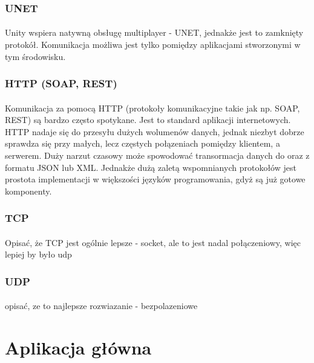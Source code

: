 \documentclass[12pt]{article}
\begin{document}
{{\subsubsection{UNET}
\paragraph{}
Unity wspiera natywną obsługę multiplayer - UNET, jednakże jest to zamknięty protokół. Komunikacja możliwa jest tylko pomiędzy aplikacjami stworzonymi w tym środowisku.

\subsubsection{HTTP (SOAP, REST)}
\paragraph{}
Komunikacja za pomocą HTTP (protokoły komunikacyjne takie jak np. SOAP, REST) są bardzo często spotykane. Jest to standard aplikacji internetowych. HTTP nadaje się do przesyłu dużych wolumenów danych, jednak niezbyt dobrze sprawdza się przy małych, lecz częstych połązeniach pomiędzy klientem, a serwerem. Duży narzut czasowy może spowodować transormacja danych do oraz z formatu JSON lub XML. Jednakże dużą zaletą wspomnianych protokołów jest prostota implementacji w większości języków programowania, gdyż są już gotowe komponenty.
\subsubsection{TCP}
\paragraph{}
{\color{red}Opisać, że TCP jest ogólnie lepsze - socket, ale to jest nadal połączeniowy, więc lepiej by było udp}
\subsubsection{UDP}
\paragraph{}
{\color{red}opisać, ze to najlepsze rozwiazanie - bezpolazeniowe}

\newpage
\section{Aplikacja główna}


}}
\end{document}
